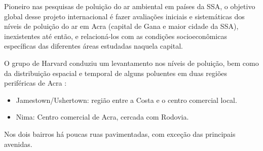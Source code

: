 Pioneiro nas pesquisas de poluição do ar ambiental em países da SSA, o objetivo 
global desse projeto internacional é fazer avaliações iniciais e sistemáticas 
dos níveis de poluição do ar em Acra (capital de Gana e maior cidade da SSA), 
inexistentes até então, e relacioná-los com as condições socioeconômicas 
específicas das diferentes áreas estudadas naquela capital.

O grupo de Harvard \citep{ARKU2008} conduziu um levantamento nos níveis de 
poluição, bem como da distribuição espacial e temporal de alguns poluentes 
em duas regiões periféricas de Acra \citep{DIONISIO2010}:

\begin{itemize}
  \item Jamestown/Ushertown: região entre a Costa e o centro comercial local.
  \item Nima: Centro comercial de Acra, cercada com Rodovia.
\end{itemize} 

Nos dois bairros há poucas ruas pavimentadas, com exceção das principais 
avenidas. 
